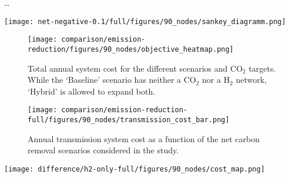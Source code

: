 \documentclass[twocolumn]{article}
\newcommand{\carbon}{CO$_2$}
\newcommand{\hydrogen}{H$_2$}
\newcommand{\hydrogengrid}{\hydrogen{}--Grid}
\begin{document}
\dots





\printbibliography

\appendix


\begin{figure*}
    \centering
    \texttt{[image: net-negative-0.1/full/figures/90\_nodes/sankey\_diagramm.png]}
    \caption{Sankey diagram of the optimal operation for a net-negative 10\% scenario.}
    \label{fig:sankey_diagramm}
\end{figure*}

\begin{figure}
    \centering
    \texttt{[image: comparison/emission-reduction/figures/90\_nodes/objective\_heatmap.png]}
    \caption{Total annual system cost for the different scenarios and \carbon{} targets. While the `Baseline' scenario has neither a \carbon{} nor a \hydrogen{} network, `Hybrid' is allowed to expand both.}
    \label{fig:objective_heatmap}
\end{figure}


\begin{figure}[ht]
    \centering
    \texttt{[image: comparison/emission-reduction-full/figures/90\_nodes/transmission\_cost\_bar.png]}
    \caption{Annual transmission system cost as a function of the net carbon removal scenarios considered in the study.}
    \label{fig:transmission_cost_bar}
\end{figure}


\begin{figure*}[ht]
    \centering
    \texttt{[image: difference/h2-only-full/figures/90\_nodes/cost\_map.png]}
    \caption{Difference in cost investments between \hydrogengrid{} and Hybrid model. The left subfigure shows higher spendings per technology and region and transport system for the \hydrogengrid{} model, the right shows higher spendings in the Hydrid model.}
    \label{fig:cost_map_difference}
\end{figure*}
\end{document}

